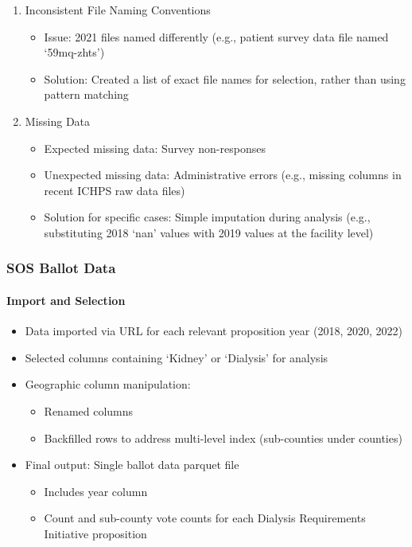 \documentclass[
  11pt,
  letterpaper,
  DIV=11,
  numbers=noendperiod]{scrartcl}
\let\oldparagraph\paragraph
\renewcommand{\paragraph}[1]{\oldparagraph{#1}\mbox{}}
\providecommand{\tightlist}{%
  \setlength{\itemsep}{0pt}\setlength{\parskip}{0pt}}\usepackage{longtable,booktabs,array}
\begin{document}
\begin{enumerate}
\def\labelenumi{\arabic{enumi}.}
\tightlist
\item
  Inconsistent File Naming Conventions

  \begin{itemize}
  \tightlist
  \item
    Issue: 2021 files named differently (e.g., patient survey data file
    named `59mq-zhts')
  \item
    Solution: Created a list of exact file names for selection, rather
    than using pattern matching
  \end{itemize}
\item
  Missing Data

  \begin{itemize}
  \tightlist
  \item
    Expected missing data: Survey non-responses
  \item
    Unexpected missing data: Administrative errors (e.g., missing
    columns in recent ICHPS raw data files)
  \item
    Solution for specific cases: Simple imputation during analysis
    (e.g., substituting 2018 `nan' values with 2019 values at the
    facility level)
  \end{itemize}
\end{enumerate}

\subsubsection{SOS Ballot Data}\label{sos-ballot-data}

\paragraph{Import and Selection}\label{import-and-selection}

\begin{itemize}
\tightlist
\item
  Data imported via URL for each relevant proposition year (2018, 2020,
  2022)
\item
  Selected columns containing `Kidney' or `Dialysis' for analysis
\item
  Geographic column manipulation:

  \begin{itemize}
  \tightlist
  \item
    Renamed columns
  \item
    Backfilled rows to address multi-level index (sub-counties under
    counties)
  \end{itemize}
\item
  Final output: Single ballot data parquet file

  \begin{itemize}
  \tightlist
  \item
    Includes year column
  \item
    Count and sub-county vote counts for each Dialysis Requirements
    Initiative proposition
  \end{itemize}
\end{itemize}
\end{document}
